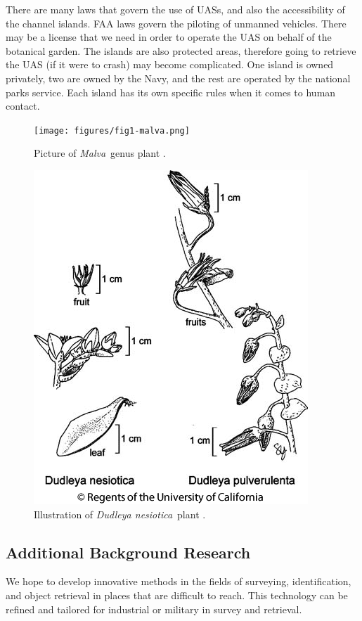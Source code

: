 \documentclass{wrcecapstone}
\newcommand{\Dudleyanesiotica}{\emph{Dudleya nesiotica}}
\newcommand{\Malva}{\emph{Malva}}
\begin{document}
There are many laws that govern the use of UASs, and also the accessibility of the channel islands.  FAA laws govern the piloting of unmanned vehicles.  There may be a license that we need in order to operate the UAS on behalf of the botanical garden.  The islands are also protected areas, therefore going to retrieve the UAS (if it were to crash) may become complicated.  One island is owned privately, two are owned by the Navy, and the rest are operated by the national parks service.  Each island has its own specific rules when it comes to human contact.
\begin{figure}
\begin{center}
\texttt{[image: figures/fig1-malva.png]}
\end{center}
\caption{Picture of \Malva\ genus plant \cite{wikipedia2019malva}.}
\label{fig:1.1.1}
\end{figure}
\begin{figure}
\begin{center}
\includegraphics[width=0.6\columnwidth]{figures/fig2-dudleya.png}
\end{center}
\caption{Illustration of \Dudleyanesiotica\ plant \cite{jeps2019dudleya}.}
\label{fig:1.1.2}
\end{figure}






\subsection{Additional Background Research}
We hope to develop innovative methods in the fields of surveying, identification, and object retrieval in places that are difficult to reach. This technology can be refined and tailored for industrial or military in survey and retrieval. 
\end{document}
